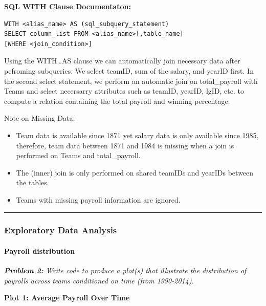 \documentclass[]{article}
\let\oldparagraph\paragraph
\renewcommand{\paragraph}[1]{\oldparagraph{#1}\mbox{}}
\begin{document}
\textbf{SQL WITH Clause Documentaton:}

\begin{verbatim}
WITH <alias_name> AS (sql_subquery_statement)
SELECT column_list FROM <alias_name>[,table_name]
[WHERE <join_condition>]
\end{verbatim}

Using the WITH\ldots{}AS clause we can automatically join necessary data
after pefroming subqueries. We select teamID, sum of the salary, and
yearID first. In the second select statement, we perform an automatic
join on total\_payroll with Teams and select necersarry attributes such
as teamID, yearID, lgID, etc. to compute a relation containing the total
payroll and winning percentage.

Note on Missing Data:

\begin{itemize}
\item
  Team data is available since 1871 yet salary data is only available
  since 1985, therefore, team data between 1871 and 1984 is missing when
  a join is performed on Teams and total\_payroll.
\item
  The (inner) join is only performed on shared teamIDs and yearIDs
  between the tables.
\item
  Teams with missing payroll information are ignored.
\end{itemize}

\begin{center}\rule{0.5\linewidth}{\linethickness}\end{center}

\subsubsection{Exploratory Data
Analysis}\label{exploratory-data-analysis}

\paragraph{Payroll distribution}\label{payroll-distribution}

\emph{\textbf{Problem 2:} Write code to produce a plot(s) that
illustrate the distribution of payrolls across teams conditioned on time
(from 1990-2014).}

\textbf{Plot 1: Average Payroll Over Time}
\end{document}
